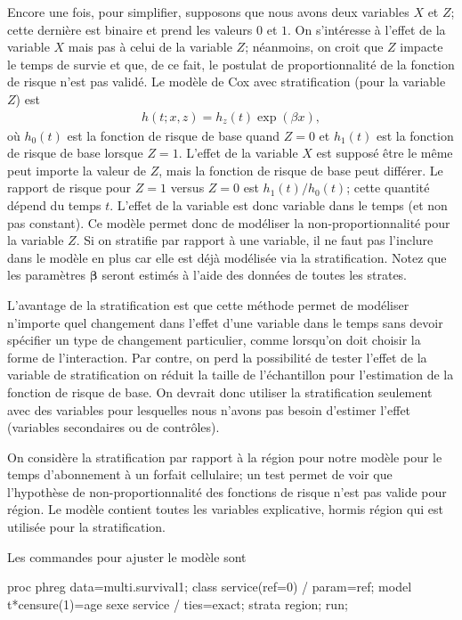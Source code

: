 \documentclass[
  11pt,
  letterpaper,
]{book}
\newenvironment{Shaded}{\begin{snugshade}}{\end{snugshade}}
\newcommand{\NormalTok}[1]{#1}
\theoremstyle{definition}
\theoremstyle{definition}
\theoremstyle{definition}
\theoremstyle{definition}
\theoremstyle{remark}
\begin{document}
Encore une fois, pour simplifier, supposons que nous avons deux variables \(X\) et \(Z\); cette dernière est binaire et prend les valeurs \(0\) et \(1\). On s'intéresse à l'effet de la variable \(X\) mais pas à celui de la variable \(Z\); néanmoins, on croit que \(Z\) impacte le temps de survie et que, de ce fait, le postulat de proportionnalité de la fonction de risque n'est pas validé. Le modèle de Cox avec stratification (pour la variable \(Z\)) est
\begin{align*}
h(t; x, z) = h_z(t) \exp(\beta x),
\end{align*}
où \(h_0(t)\) est la fonction de risque de base quand \(Z=0\) et \(h_1(t)\) est la fonction de risque de base lorsque \(Z=1\). L'effet de la variable \(X\) est supposé être le même peut importe la valeur de \(Z\), mais la fonction de risque de base peut différer. Le rapport de risque pour \(Z=1\) versus \(Z=0\) est \(h_1(t)/h_0(t)\); cette quantité dépend du temps \(t\). L'effet de la variable est donc variable dans le temps (et non pas constant). Ce modèle permet donc de modéliser la non-proportionnalité pour la variable \(Z\). Si on stratifie par rapport à une variable, il ne faut pas l'inclure dans le modèle en plus car elle est déjà modélisée via la stratification. Notez que les paramètres \(\boldsymbol{\beta}\) seront estimés à l'aide des données de toutes les strates.

L'avantage de la stratification est que cette méthode permet de modéliser n'importe quel changement dans l'effet d'une variable dans le temps sans devoir spécifier un type de changement particulier, comme lorsqu'on doit choisir la forme de l'interaction. Par contre, on perd la possibilité de tester l'effet de la variable de stratification on réduit la taille de l'échantillon pour l'estimation de la fonction de risque de base. On devrait donc utiliser la stratification seulement avec des variables pour lesquelles nous n'avons pas besoin d'estimer l'effet (variables secondaires ou de contrôles).

On considère la stratification par rapport à la région pour notre modèle pour le temps d'abonnement à un forfait cellulaire; un test permet de voir que l'hypothèse de non-proportionnalité des fonctions de risque n'est pas valide pour région. Le modèle contient toutes les variables explicative, hormis région qui est utilisée pour la stratification.

Les commandes pour ajuster le modèle sont

\begin{Shaded}
\begin{Highlighting}[]
\NormalTok{proc phreg data=multi.survival1;}
\NormalTok{class service(ref=\textquotesingle{}0\textquotesingle{}) / param=ref;}
\NormalTok{model t*censure(1)=age sexe service / ties=exact;}
\NormalTok{strata region;}
\NormalTok{run;}
\end{Highlighting}
\end{Shaded}
\end{document}

